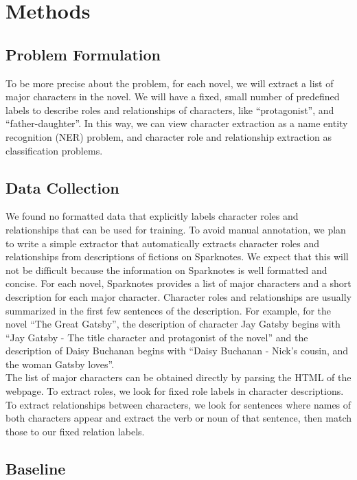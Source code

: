 \documentclass[12pt]{article}
\begin{document}
\section{Methods}
\subsection{Problem Formulation}
    To be more precise about the problem, for each novel, we will extract a list of major characters in the novel. We will have a fixed, small number of  
    predefined labels to describe roles and relationships of characters, like ``protagonist'', and ``father-daughter''.  
    In this way, we can view character extraction as a name entity recognition (NER) problem,
    and character role and relationship extraction as classification problems.

\subsection{Data Collection}
    We found no formatted data that explicitly labels character roles and relationships that can be used for training.
    To avoid manual annotation, we plan to write a simple extractor that automatically extracts character roles and relationships from
    descriptions of fictions on Sparknotes. We expect that this will not be difficult because the information on Sparknotes is 
    well formatted and concise. For each novel, Sparknotes provides a list of major characters and a short description for each major
    character. Character roles and relationships are usually summarized in the first few sentences of the description. For example,
    for the novel ``The Great Gatsby'', the description of character Jay Gatsby begins with ``Jay Gatsby -  The title character and protagonist of the novel''
    and the description of Daisy Buchanan begins with ``Daisy Buchanan - Nick's cousin, and the woman Gatsby loves''. \\

    The list of major characters can be obtained directly by parsing the HTML of the webpage.
    To extract roles, we look for fixed role labels in character descriptions. To extract relationships between characters, we look for sentences where names of both characters appear and extract the verb or noun of that sentence, then match those to our fixed relation labels. 

\subsection{Baseline}
\end{document}
